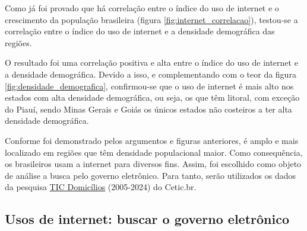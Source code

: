 Como já foi provado que há correlação entre o índice do uso de internet e o crescimento da população brasileira (figura \ref{fig:internet_correlacao}), testou-se a correlação entre o índice do uso de internet e a densidade demográfica das regiões.

O resultado foi uma correlação positiva e alta entre o índice do uso de internet e a densidade demográfica. Devido a isso, e complementando com o teor da figura \ref{fig:densidade_demografica}, confirmou-se que o uso de internet é mais alto nos estados com alta densidade demográfica, ou seja, os que têm litoral, com exceção do Piauí, sendo Minas Gerais e Goiás os únicos estados não costeiros a ter alta densidade demográfica.

Conforme foi demonstrado pelos argumentos e figuras anteriores, é amplo e mais localizado em regiões que têm densidade populacional maior. Como consequência, os brasileiros usam a internet para diversos fins. Assim, foi escolhido como objeto de análise a busca pelo governo eletrônico. Para tanto, serão utilizados os dados da pesquisa \href{https://cetic.br/pt/pesquisa/domicilios/}{TIC Domicílios} (2005-2024) do Cetic.br.

\subsection{Usos de internet: buscar o governo eletrônico}
\label{uso_internet_buscar_egov}